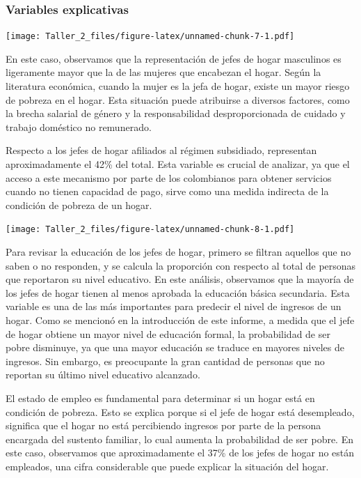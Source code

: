 \documentclass[
]{article}
\begin{document}
\hypertarget{variables-explicativas}{%
\subsubsection{Variables explicativas}\label{variables-explicativas}}

\texttt{[image: Taller\_2\_files/figure-latex/unnamed-chunk-7-1.pdf]}

En este caso, observamos que la representación de jefes de hogar
masculinos es ligeramente mayor que la de las mujeres que encabezan el
hogar. Según la literatura económica, cuando la mujer es la jefa de
hogar, existe un mayor riesgo de pobreza en el hogar. Esta situación
puede atribuirse a diversos factores, como la brecha salarial de género
y la responsabilidad desproporcionada de cuidado y trabajo doméstico no
remunerado.

Respecto a los jefes de hogar afiliados al régimen subsidiado,
representan aproximadamente el 42\% del total. Esta variable es crucial
de analizar, ya que el acceso a este mecanismo por parte de los
colombianos para obtener servicios cuando no tienen capacidad de pago,
sirve como una medida indirecta de la condición de pobreza de un hogar.

\texttt{[image: Taller\_2\_files/figure-latex/unnamed-chunk-8-1.pdf]}

Para revisar la educación de los jefes de hogar, primero se filtran
aquellos que no saben o no responden, y se calcula la proporción con
respecto al total de personas que reportaron su nivel educativo. En este
análisis, observamos que la mayoría de los jefes de hogar tienen al
menos aprobada la educación básica secundaria. Esta variable es una de
las más importantes para predecir el nivel de ingresos de un hogar. Como
se mencionó en la introducción de este informe, a medida que el jefe de
hogar obtiene un mayor nivel de educación formal, la probabilidad de ser
pobre disminuye, ya que una mayor educación se traduce en mayores
niveles de ingresos. Sin embargo, es preocupante la gran cantidad de
personas que no reportan su último nivel educativo alcanzado.

El estado de empleo es fundamental para determinar si un hogar está en
condición de pobreza. Esto se explica porque si el jefe de hogar está
desempleado, significa que el hogar no está percibiendo ingresos por
parte de la persona encargada del sustento familiar, lo cual aumenta la
probabilidad de ser pobre. En este caso, observamos que aproximadamente
el 37\% de los jefes de hogar no están empleados, una cifra considerable
que puede explicar la situación del hogar.
\end{document}
